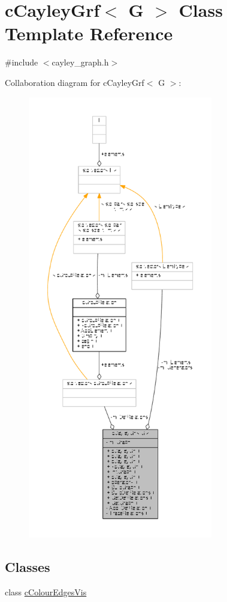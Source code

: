 \hypertarget{classcCayleyGrf}{\section{c\-Cayley\-Grf$<$ G $>$ Class Template Reference}
\label{classcCayleyGrf}
}


{\ttfamily \#include $<$cayley\-\_\-graph.\-h$>$}



Collaboration diagram for c\-Cayley\-Grf$<$ G $>$\-:
\nopagebreak
\begin{figure}[H]
\begin{center}
\leavevmode
\includegraphics[height=550pt]{classcCayleyGrf__coll__graph}
\end{center}
\end{figure}
\subsection*{Classes}
\begin{DoxyCompactItemize}
\item 
class \hyperlink{classcCayleyGrf_1_1cColourEdgesVis}{c\-Colour\-Edges\-Vis}
\end{DoxyCompactItemize}
